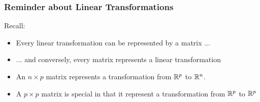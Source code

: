 \documentclass{beamer}
\begin{document}
\begin{frame}
  \frametitle{Reminder about Linear Transformations}

Recall:

\begin{itemize}
\item Every linear transformation can be represented by a matrix ...

\item ... and conversely, every matrix represents a linear transformation

\item An $n \times p$ matrix represents a transformation from $\mathbb{R}^p$ to $\mathbb{R}^n$.

\item A $p \times p$ matrix is special in that it represent a transformation from $\mathbb{R}^p$ to $\mathbb{R}^p$

\end{itemize}


\end{frame}
\end{document}
